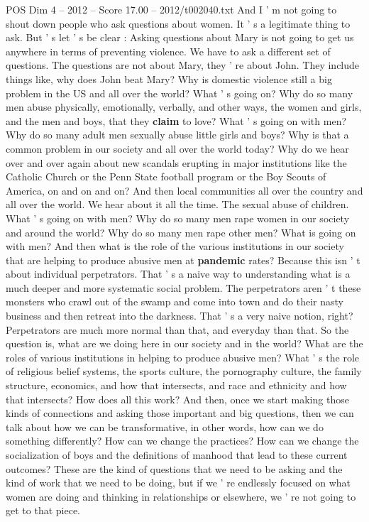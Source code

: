 \begin{textsample}{POS Dim 4 – 2012 – Score 17.00 – 2012/t002040.txt}
And I ' m not going to shout down people who ask questions about women.
It ' s a legitimate thing to ask.
But ' s let ' s be clear : Asking questions about Mary is not going to get us anywhere in terms of preventing violence.
We have to ask a different set of questions.
The questions are not about Mary, they ' re about John.
They include things like, why does John beat Mary?
Why is domestic violence still a big problem in the US and all over the world?
What ' s going on?
Why do so many men abuse physically, emotionally, verbally, and other ways, the women and girls, and the men and boys, that they \textbf{claim} to love?
What ' s going on with men?
Why do so many adult men sexually abuse little girls and boys?
Why is that a common problem in our society and all over the world today?
Why do we hear over and over again about new scandals erupting in major institutions like the Catholic Church or the Penn State football program or the Boy Scouts of America, on and on and on?
And then local communities all over the country and all over the world.
We hear about it all the time.
The sexual abuse of children.
What ' s going on with men?
Why do so many men rape women in our society and around the world?
Why do so many men rape other men?
What is going on with men?
And then what is the role of the various institutions in our society that are helping to produce abusive men at \textbf{pandemic} rates?
Because this isn ' t about individual perpetrators.
That ' s a naive way to understanding what is a much deeper and more systematic social problem.
The perpetrators aren ' t these monsters who crawl out of the swamp and come into town and do their nasty business and then retreat into the darkness.
That ' s a very naive notion, right?
Perpetrators are much more normal than that, and everyday than that.
So the question is, what are we doing here in our society and in the world?
What are the roles of various institutions in helping to produce abusive men?
What ' s the role of religious belief systems, the sports culture, the pornography culture, the family structure, economics, and how that intersects, and race and ethnicity and how that intersects?
How does all this work?
And then, once we start making those kinds of connections and asking those important and big questions, then we can talk about how we can be transformative, in other words, how can we do something differently?
How can we change the practices?
How can we change the socialization of boys and the definitions of manhood that lead to these current outcomes?
These are the kind of questions that we need to be asking and the kind of work that we need to be doing, but if we ' re endlessly focused on what women are doing and thinking in relationships or elsewhere, we ' re not going to get to that piece.

\end{textsample}
